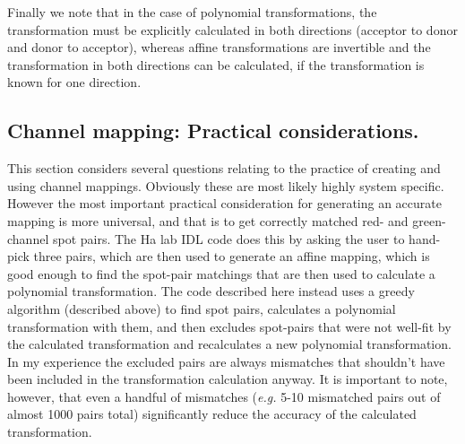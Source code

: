 \documentclass[11pt]{article}
\begin{document}
Finally we note that in the case of polynomial transformations, the transformation must be explicitly calculated in both directions (acceptor to donor and donor to acceptor), whereas affine transformations are invertible and the transformation in both directions can be calculated, if the transformation is known for one direction.

%
%
%

\subsection{Channel mapping: Practical considerations.}\label{sec:TformPracticals}

This section considers several questions relating to the practice of creating and using channel mappings. Obviously these are most likely highly system specific.  However the most important practical consideration for generating an accurate mapping is more universal, and that is to get correctly matched red- and green-channel spot pairs.  The Ha lab IDL code does this by asking the user to hand-pick three pairs, which are then used to generate an affine mapping, which is good enough to find the spot-pair matchings that are then used to calculate a polynomial transformation.  The code described here instead uses a greedy algorithm (described above) to find spot pairs, calculates a polynomial transformation with them, and then excludes spot-pairs that were not well-fit by the calculated transformation and recalculates a new polynomial transformation.  In my experience the excluded pairs are always mismatches that shouldn't have been included in the transformation calculation anyway.  It is important to note, however, that even a handful of mismatches ({\it e.g.} 5-10 mismatched pairs out of almost 1000 pairs total) significantly reduce the accuracy of the calculated transformation.
\end{document}

